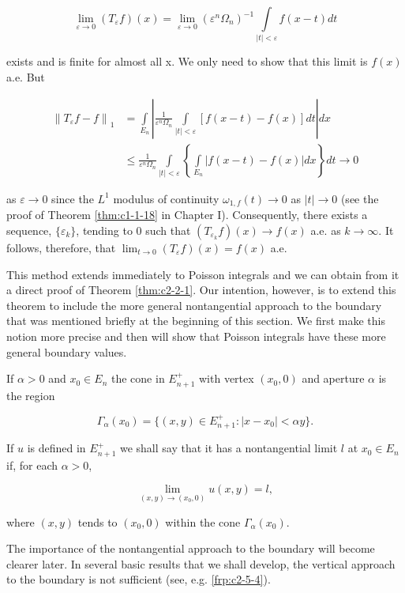 \[
\lim_{\varepsilon\to0}\left(T_{\varepsilon}f\right)(x)=\lim_{\varepsilon\to0}\left(\varepsilon^{n}\Omega_{n}\right)^{-1}\int\limits_{|t|<\varepsilon}f(x-t)dt
\]

exists and is finite for almost all x. We only need to show that this limit is $f(x)$ a.e. But

\[
\begin{aligned}\left\|T_{\varepsilon}f-f\right\|_{1}&=\int\limits_{E_{n}}\left|\frac{1}{\varepsilon^{n}\Omega_{n}}\int\limits_{|t|<\varepsilon}\left[f(x-t)-f(x)\right]dt\right|dx\\&\leq\frac{1}{\varepsilon^{n}\Omega_{n}}\int\limits_{|t|<\varepsilon}\left\{\int\limits_{E_{n}}\left|f(x-t)-f(x)\right|dx\right\}dt\to0\end{aligned}
\]

as $\varepsilon \to 0$ since the $L^1$ modulus of continuity $\omega_{1,f}(t) \to 0$ as $|t| \to 0$ (see the proof of Theorem \ref{thm:c1-1-18} in Chapter I). Consequently, there exists a sequence, $\{\varepsilon_k\}$, tending to 0 such that $(T_{\varepsilon_k}f)(x) \to f(x)$ a.e. as $k \to \infty$. It follows, therefore, that $\lim_{t \to 0}(T_{\varepsilon}f)(x) = f(x)$ a.e.

This method extends immediately to Poisson integrals and we can obtain from it a direct proof of Theorem \ref{thm:c2-2-1}. Our intention, however, is to extend this theorem to include the more general nontangential approach to the boundary that was mentioned briefly at the beginning of this section. We first make this notion more precise and then will show that Poisson integrals have these more general boundary values.

If $\alpha > 0$ and $x_0 \in E_n$ the cone in $E_{n+1}^+$ with vertex $(x_0, 0)$ and aperture $\alpha$ is the region

\[
\Gamma_{\alpha}(x_{0})=\{(x,y)\in E_{n+1}^{+}\colon|x-x_{0}|<\alpha y\}.
\]

If $u$ is defined in $E_{n+1}^{+}$ we shall say that it has a nontangential limit $l$ at $x_0 \in E_n$ if, for each $\alpha > 0$,

\begin{equation}\label{eq:c2-3-15}
\lim\limits_{(x,y)\to(x_{0},0)}u(x,y)=l,
\end{equation}

where $(x,y)$ tends to $(x_{0},0)$ within the cone $\Gamma_{\alpha}(x_{0})$.

The importance of the nontangential approach to the boundary will become clearer later. In several basic results that we shall develop, the vertical approach to the boundary is not sufficient (see, e.g. \eqref{frp:c2-5-4}).

